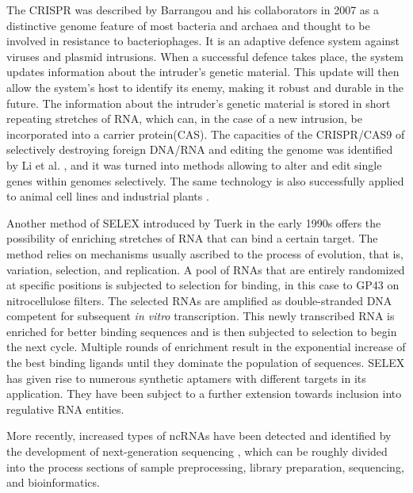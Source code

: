 The  \ac{CRISPR} \cite{barrangou2007crispr} was described by Barrangou and his collaborators in 2007 as a distinctive genome feature of most bacteria and archaea and thought to be involved in resistance to bacteriophages. It is an adaptive defence system against viruses and plasmid intrusions. When a successful defence takes place, the system updates information about the intruder's genetic material. This update will then allow the system's host to identify its enemy, making it robust and durable in the future. The information about the intruder's genetic material is stored in short repeating stretches of \ac{RNA}, which can, in the case of a new intrusion, be incorporated into a carrier protein(CAS). The capacities of the   \ac{CRISPR}/CAS9 of selectively destroying foreign \ac{DNA}/\ac{RNA} and editing the genome was identified by Li et al. \cite{li2016harnessing}, and it was turned into methods allowing to alter and edit single genes within genomes selectively. The same technology is also successfully applied to animal cell lines \cite{hwang2013efficient, jinek2013rna, wang2013one} and industrial plants \cite{svitashev2015targeted,li2015cas9}. 

Another method of \ac{SELEX} \cite{tuerk1990systematic} introduced by Tuerk in the early 1990s offers the possibility of enriching stretches of \ac{RNA} that can bind a certain target. The method relies on mechanisms usually ascribed to the process of evolution, that is, variation, selection, and replication. A pool of \acp{RNA} that are entirely randomized at specific positions is subjected to selection for binding, in this case to GP43 on nitrocellulose filters. The selected \acp{RNA} are amplified as double-stranded \ac{DNA} competent for subsequent \textit{in vitro} transcription. This newly transcribed \ac{RNA} is enriched for better binding sequences and is then subjected to selection to begin the next cycle. Multiple rounds of enrichment result in the exponential increase of the best binding ligands until they dominate the population of sequences. \ac{SELEX} has given rise to numerous synthetic aptamers with different targets in its application. They have been subject to a further extension towards inclusion into regulative \ac{RNA} entities.

More recently, increased types of \acp{ncRNA} have been detected and identified by the development of next-generation sequencing \cite{wang2009rna}, which can be roughly divided into the process sections of sample preprocessing, library preparation, sequencing, and bioinformatics. 

